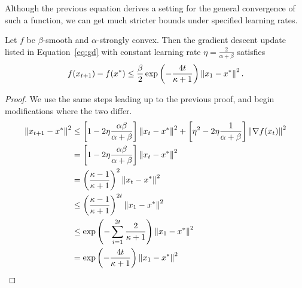 Although the previous equation derives a setting for the general convergence of
such a function, we can get much stricter bounds under specified learning rates.

\begin{theorem}[Convergence for $\eta = 2 / (\alpha + \beta)$]
    Let $f$ be $\beta$-smooth and $\alpha$-strongly convex. Then the
    gradient descent update listed in Equation~\ref{eq:gd} with constant learning rate
    $\eta = \frac{2}{\alpha + \beta} $ satisfies
    \begin{equation}
        f(x_{t+1}) - f(x^*) \leq \frac{\beta}{2} \exp \left( - \frac{4t}{\kappa
        + 1} \right) \left\| x_1 - x^* \right\|^2.
    \end{equation}
\end{theorem}

\begin{proof}
    We use the same steps leading up to the previous proof, and begin
    modifications where the two differ.
    \begin{equation}
        \begin{aligned}
            \left\| x_{t + 1} - x^* \right\|^2 
            &\leq \left[ 1 - 2\eta \frac{\alpha \beta}{\alpha + \beta}
            \right]\left\| x_t - x^* \right\|^2 + \left[  \eta^2  - 2\eta\frac{1}{\alpha +
            \beta} \right]\left\| \nabla f(x_t) \right\|^2\\
            &= \left[ 1 - 2\eta \frac{\alpha \beta}{\alpha + \beta}
            \right]\left\| x_t - x^* \right\|^2 \\
            &= {\left( \frac{\kappa - 1}{\kappa + 1} 
            \right)}^2\left\| x_t - x^* \right\|^2 \\
            &\leq {\left( \frac{\kappa - 1}{\kappa + 1} 
            \right)}^{2t}\left\| x_1 - x^* \right\|^2 \\
            &\leq \exp \left( -\sum_{i = 1}^{2t} \frac{2}{\kappa
        + 1} \right) \left\| x_1 - x^* \right\|^2 \\
            &= \exp \left( - \frac{4t}{\kappa
        + 1} \right) \left\| x_1 - x^* \right\|^2
        \end{aligned}
    \end{equation}
\end{proof}
